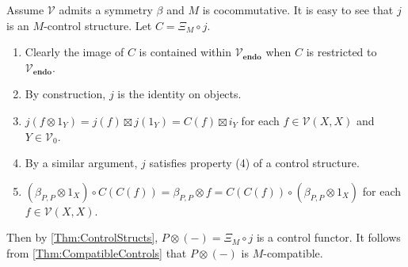 \begin{exa}
    \label{Ex:TrivCtrl}
    Assume $\mathcal{V}$ admits a symmetry $\beta$ and $M$ is cocommutative.
    It is easy to see that $j$ is an $M$-control structure.
    Let $C = \Xi_M \circ j$.
    \begin{enumerate}
    \item Clearly the image of $C$ is contained within $\mathcal{V}_{\mathbf{endo}}$ when $C$ is restricted to $\mathcal{V}_{\mathbf{endo}}$.
    \item By construction, $j$ is the identity on objects.
    \item $j( f \otimes 1_Y ) = j( f ) \boxtimes j( 1_Y ) = C( f ) \boxtimes i_Y$ for each $f \in \mathcal{V}( X, X )$ and $Y \in \mathcal{V}_0$.
    \item By a similar argument, $j$ satisfies property (4) of a control structure.
    \item $( \beta_{P,P} \otimes 1_X ) \circ C( C( f ) ) = \beta_{P,P} \otimes f = C( C( f ) ) \circ ( \beta_{P,P} \otimes 1_X )$ for each $f \in \mathcal{V}( X, X )$.
    \end{enumerate}
    Then by \cref{Thm:ControlStructs}, $P \otimes ( - ) = \Xi_M \circ j$ is a control functor.
    It follows from \cref{Thm:CompatibleControls} that $P \otimes ( - )$ is $M$-compatible.
\end{exa}

